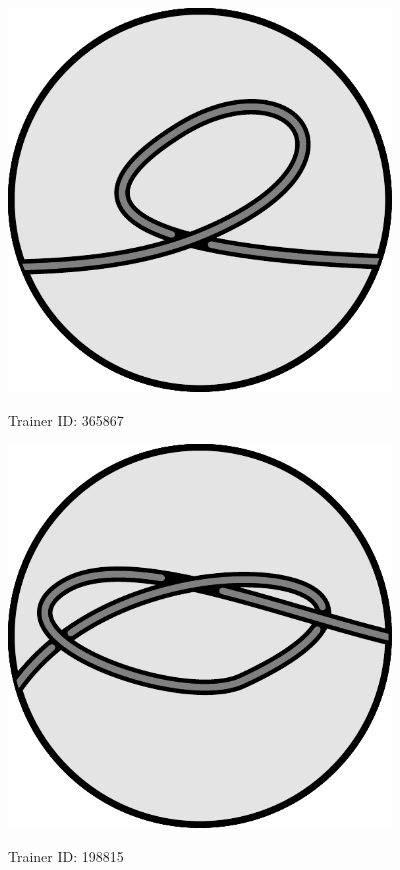
  \begin{center}
    \includegraphics[width=4in]{assets/unknot1.pdf}

    \Huge Trainer ID: 365867

  \end{center}

  \begin{center}

    \includegraphics[width=4in]{assets/knot1.pdf}

    \Huge Trainer ID: 198815
%
%
%
  \end{center}

